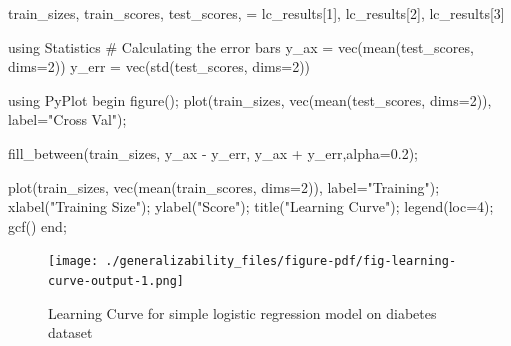 \documentclass[
  letterpaper,
]{book}
\newenvironment{Shaded}{\begin{snugshade}}{\end{snugshade}}
\newcommand{\BuiltInTok}[1]{\textcolor[rgb]{0.00,0.23,0.31}{#1}}
\newcommand{\CommentTok}[1]{\textcolor[rgb]{0.37,0.37,0.37}{#1}}
\newcommand{\ControlFlowTok}[1]{\textcolor[rgb]{0.00,0.23,0.31}{#1}}
\newcommand{\FloatTok}[1]{\textcolor[rgb]{0.68,0.00,0.00}{#1}}
\newcommand{\FunctionTok}[1]{\textcolor[rgb]{0.28,0.35,0.67}{#1}}
\newcommand{\ImportTok}[1]{\textcolor[rgb]{0.00,0.46,0.62}{#1}}
\newcommand{\NormalTok}[1]{\textcolor[rgb]{0.00,0.23,0.31}{#1}}
\newcommand{\OperatorTok}[1]{\textcolor[rgb]{0.37,0.37,0.37}{#1}}
\newcommand{\StringTok}[1]{\textcolor[rgb]{0.13,0.47,0.30}{#1}}
\begin{document}
\begin{Shaded}
\begin{Highlighting}[]
\NormalTok{train\_sizes, train\_scores, test\_scores, }\OperatorTok{=} 
\NormalTok{    lc\_results[}\FloatTok{1}\NormalTok{], lc\_results[}\FloatTok{2}\NormalTok{], lc\_results[}\FloatTok{3}\NormalTok{]}

\ImportTok{using} \BuiltInTok{Statistics}
\CommentTok{\# Calculating the error bars }
\NormalTok{y\_ax }\OperatorTok{=} \FunctionTok{vec}\NormalTok{(}\FunctionTok{mean}\NormalTok{(test\_scores, dims}\OperatorTok{=}\FloatTok{2}\NormalTok{)) }
\NormalTok{y\_err }\OperatorTok{=} \FunctionTok{vec}\NormalTok{(}\FunctionTok{std}\NormalTok{(test\_scores, dims}\OperatorTok{=}\FloatTok{2}\NormalTok{))}

\ImportTok{using} \BuiltInTok{PyPlot}
\ControlFlowTok{begin} 
    \FunctionTok{figure}\NormalTok{();}
    \FunctionTok{plot}\NormalTok{(train\_sizes,}
        \FunctionTok{vec}\NormalTok{(}\FunctionTok{mean}\NormalTok{(test\_scores, dims}\OperatorTok{=}\FloatTok{2}\NormalTok{)), label}\OperatorTok{=}\StringTok{"Cross Val"}\NormalTok{);}

    \FunctionTok{fill\_between}\NormalTok{(train\_sizes,}
\NormalTok{        y\_ax }\OperatorTok{{-}}\NormalTok{ y\_err, y\_ax }\OperatorTok{+}\NormalTok{ y\_err,alpha}\OperatorTok{=}\FloatTok{0.2}\NormalTok{);}

    \FunctionTok{plot}\NormalTok{(train\_sizes,}
        \FunctionTok{vec}\NormalTok{(}\FunctionTok{mean}\NormalTok{(train\_scores, dims}\OperatorTok{=}\FloatTok{2}\NormalTok{)), label}\OperatorTok{=}\StringTok{"Training"}\NormalTok{);}
    \FunctionTok{xlabel}\NormalTok{(}\StringTok{"Training Size"}\NormalTok{); }
    \FunctionTok{ylabel}\NormalTok{(}\StringTok{"Score"}\NormalTok{); }
    \FunctionTok{title}\NormalTok{(}\StringTok{"Learning Curve"}\NormalTok{);}
    \FunctionTok{legend}\NormalTok{(loc}\OperatorTok{=}\FloatTok{4}\NormalTok{);}
    \FunctionTok{gcf}\NormalTok{()}
\ControlFlowTok{end}\NormalTok{;}
\end{Highlighting}
\end{Shaded}

\begin{figure}

{\centering \texttt{[image: ./generalizability\_files/figure-pdf/fig-learning-curve-output-1.png]}

}

\caption{\label{fig-learning-curve}Learning Curve for simple logistic
regression model on diabetes dataset}

\end{figure}
\end{document}
